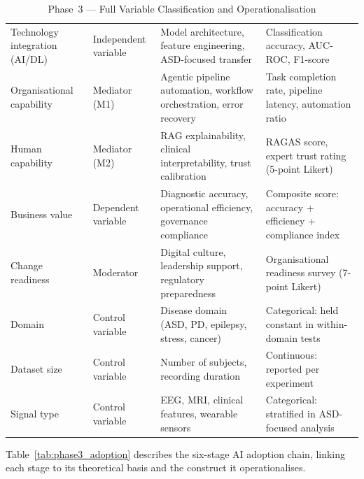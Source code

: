 \begingroup\singlespacing\tablefontsize\tablestripes
\begin{xltabular}{\textwidth}{@{} X p{0.12\textwidth} X X @{}}
\caption{Phase~3 --- Full Variable Classification and Operationalisation}
\label{tab:phase3_variables}\\
\toprule
{} &  &  &  \\
\midrule
\endfirsthead
\endhead
\bottomrule
\endlastfoot
Technology integration (AI/DL)  & Independent variable  & Model architecture, feature engineering, ASD-focused transfer    & Classification accuracy, AUC-ROC, F1-score \\
\addlinespace
Organisational capability          & Mediator (M1)         & Agentic pipeline automation, workflow orchestration, error recovery & Task completion rate, pipeline latency, automation ratio \\
\addlinespace
Human capability                   & Mediator (M2)         & RAG explainability, clinical interpretability, trust calibration  & RAGAS score, expert trust rating (5-point Likert) \\
\addlinespace
Business value                     & Dependent variable    & Diagnostic accuracy, operational efficiency, governance compliance & Composite score: accuracy + efficiency + compliance index \\
\addlinespace
Change readiness                   & Moderator             & Digital culture, leadership support, regulatory preparedness      & Organisational readiness survey (7-point Likert) \\
\addlinespace
Domain                             & Control variable      & Disease domain (ASD, PD, epilepsy, stress, cancer)           & Categorical: held constant in within-domain tests \\
\addlinespace
Dataset size                       & Control variable      & Number of subjects, recording duration                           & Continuous: reported per experiment \\
\addlinespace
Signal type                        & Control variable      & EEG, MRI, clinical features, wearable sensors                    & Categorical: stratified in ASD-focused analysis \\
\end{xltabular}
\endgroup

\vspace{1.5em}

Table~\ref{tab:phase3_adoption} describes the six-stage AI adoption chain, linking each stage to its theoretical basis and the construct it operationalises.


